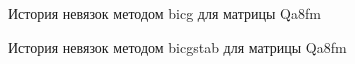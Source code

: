 \begin{figure}[H]
    \renewcommand{\figurename}{Рисунок}
    \caption{История невязок методом bicg для матрицы Qa8fm}
    \label{fig:image_12}
\end{figure}

\begin{figure}[H]
    \renewcommand{\figurename}{Рисунок}
    \caption{История невязок методом bicgstab для матрицы Qa8fm}
    \label{fig:image_13}
\end{figure}

